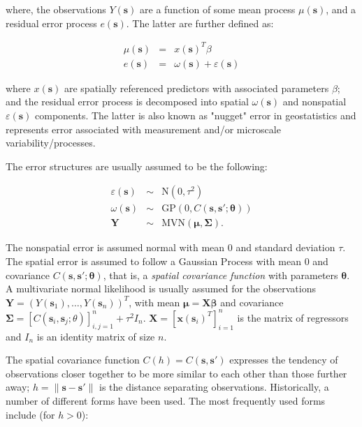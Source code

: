 \documentclass[letterpaper,portrait,11pt]{scrartcl}
\numberwithin{equation}{section}    %
\numberwithin{figure}{section}    %
\numberwithin{table}{section}       %
\begin{document}
where, the observations $Y(\bm{s})$ are a function of some mean process $\mu(\bm{s})$, and a residual error process $e(\bm{s})$. The latter are further defined as:

\begin{eqnarray*}
  \mu(\bm{s}) &=& x(\bm{s})^{T} \beta \\
  e(\bm{s})  &=& \omega(\bm{s}) + \varepsilon(\bm{s})
\end{eqnarray*}

where $x(\bm{s})$ are spatially referenced predictors with associated parameters $\beta$;  and the residual error process is decomposed into spatial $\omega(\bm{s})$ and nonspatial  $\varepsilon(\bm{s})$ components. The latter is also known as "nugget" error in geostatistics and represents error associated with measurement and/or microscale variability/processes.

The error structures are usually assumed to be the following:

\begin{eqnarray*}
  \varepsilon(\bm{s})  &\sim& \textrm{N}(0, \tau^2) \\
  \omega(\bm{s}) &\sim& \textrm{GP}(0, C(\bm{s},\bm{s}'; \bm{\theta}))  \\
  \bm{Y} &\sim& \textrm{MVN}( \bm{\mu}, \bm{\Sigma}).
\end{eqnarray*}

The nonspatial error is assumed normal with mean 0 and standard deviation $\tau$. The spatial error is assumed to follow a Gaussian Process with mean 0 and covariance $C(\bm{s},\bm{s}'; \bm{\theta})$, that is, a \textit{spatial covariance function} with parameters $\bm{\theta}$. A multivariate normal likelihood is usually assumed for the observations $\bm{Y} = (Y(\bm{s}_1), \dots, Y(\bm{s}_n) )^T$, with mean $\bm{\mu} = \bm{X} \bm{\beta}$ and covariance $\bm{\Sigma} = \left[ C(\bm{s}_i, \bm{s}_j; \theta) \right]^{n}_{i,j=1}+ \tau^2 I_n$. $\bm{X} = \left[ \bm{x}(\bm{s}_i)^T \right]^{n}_{i=1}$ is the matrix of regressors and $I_n$ is an identity matrix of size $n$.


The spatial covariance function $C(h) = C(\bm{s}, \bm{s}')$ expresses the tendency of observations closer together to be more similar to each other than those further away; $h=\| \bm{s} - \bm{s}' \|$ is the distance separating observations. Historically, a number of different forms have been used. The most frequently used forms include (for $h>0$):
\end{document}
